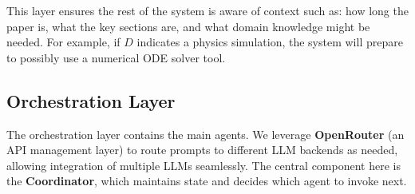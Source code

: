 \documentclass{ieeeaccess}
\begin{document}
This layer ensures the rest of the system is aware of context such as: how long the paper is, what the key sections are, and what domain knowledge might be needed. For example, if $D$ indicates a physics simulation, the system will prepare to possibly use a numerical ODE solver tool.

\subsection{Orchestration Layer}
The orchestration layer contains the main agents. We leverage \textbf{OpenRouter} (an API management layer) to route prompts to different LLM backends as needed, allowing integration of multiple LLMs seamlessly. The central component here is the \textbf{Coordinator}, which maintains state and decides which agent to invoke next.
\end{document}

